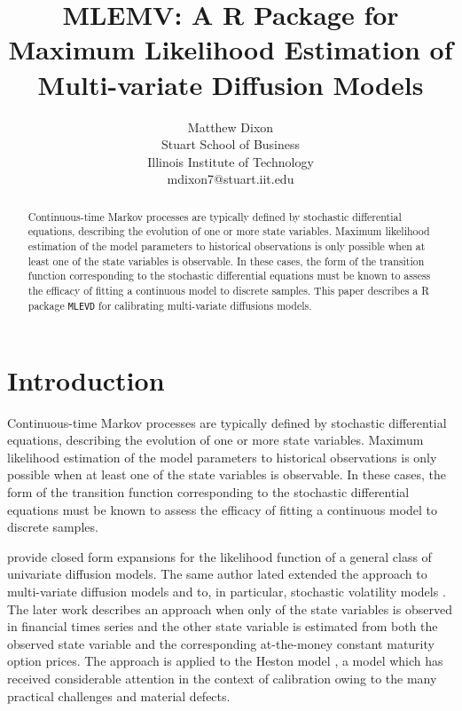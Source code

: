 \documentclass{article}
\begin{document}
\setlength{\pdfpageheight}{\paperheight}
\setlength{\pdfpagewidth}{\paperwidth}


\title{MLEMV: A R Package for Maximum Likelihood Estimation of Multi-variate Diffusion Models}

\author{Matthew Dixon\\
           Stuart School of Business\\
	   Illinois Institute of Technology\\
           mdixon7@stuart.iit.edu}

\maketitle
\begin{abstract}
Continuous-time Markov
processes are typically defined by stochastic differential equations, describing the evolution of one or more state variables.
Maximum likelihood estimation of the model parameters to historical observations is only possible when at least one of the state variables is observable. In these cases, the form of the transition function corresponding to the stochastic differential equations must be known to assess the efficacy of fitting a continuous model to discrete samples.  This paper describes a R package \verb|MLEVD| for calibrating multi-variate diffusions models.
\end{abstract}


\section{Introduction}
Continuous-time Markov
processes are typically defined by stochastic differential equations, describing the evolution of one or more state variables.
Maximum likelihood estimation of the model parameters to historical observations is only possible when at least one of the state variables is observable. In these cases, the form of the transition function corresponding to the stochastic differential equations must be known to assess the efficacy of fitting a continuous model to discrete samples.  


\cite{Sahalia2002} provide closed form expansions for the likelihood function of a general class of univariate diffusion models. The same author lated extended the approach to multi-variate diffusion models \cite{Sahalia2008} and to, in particular, stochastic volatility models \cite{Sahalia2007}. The later work describes an approach when only of the state variables is observed in financial times series and the other state variable is estimated from both the observed state variable and the corresponding at-the-money constant maturity option prices. The approach is applied to the Heston model \cite{HESTON1993}, a model which has received considerable attention in the context of calibration owing to the many practical challenges and material defects. 
\end{document}

